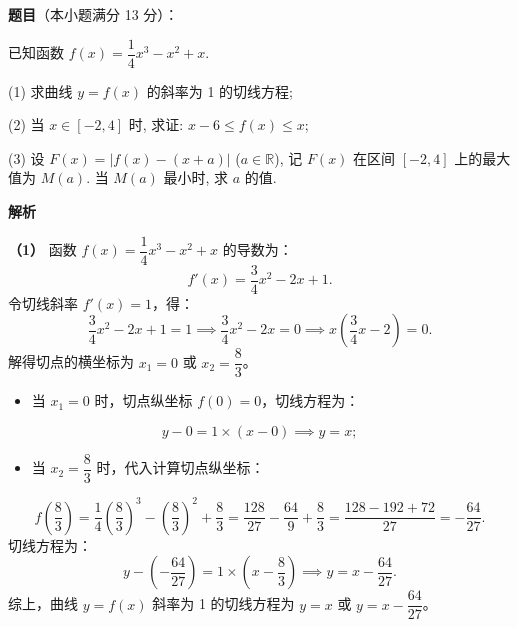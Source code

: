 \begin{answer}

\textbf{题目}（本小题满分 13 分）：

已知函数 $f(x) = \dfrac{1}{4}x^3 - x^2 + x$.

(1) 求曲线 $y = f(x)$ 的斜率为 1 的切线方程;

(2) 当 $x \in [-2, 4]$ 时, 求证: $x - 6 \leqslant f(x) \leqslant x$;

(3) 设 $F(x) = |f(x) - (x + a)|$ ($a \in \mathbb{R}$), 记 $F(x)$ 在区间 $[-2, 4]$ 上的最大值为 $M(a)$. 当 $M(a)$ 最小时, 求 $a$ 的值.

\textbf{解析}

\textbf{（1）}
函数 $f(x) = \dfrac{1}{4}x^3 - x^2 + x$ 的导数为：
\nopagebreak[4]
\[f'(x) = \dfrac{3}{4}x^2 - 2x + 1.\]
令切线斜率 $f'(x) = 1$，得：
\nopagebreak[4]
\[\dfrac{3}{4}x^2 - 2x + 1 = 1 \implies \dfrac{3}{4}x^2 - 2x = 0 \implies x\left(\dfrac{3}{4}x - 2\right) = 0.\]
解得切点的横坐标为 $x_1 = 0$ 或 $x_2 = \dfrac{8}{3}$。
\begin{itemize}
\item 当 $x_1 = 0$ 时，切点纵坐标 $f(0) = 0$，切线方程为：
\end{itemize}
\nopagebreak[4]
\[y - 0 = 1 \times (x - 0) \implies y = x;\]
\begin{itemize}
\item 当 $x_2 = \dfrac{8}{3}$ 时，代入计算切点纵坐标：
\end{itemize}
\nopagebreak[4]
\[f\left(\dfrac{8}{3}\right) = \dfrac{1}{4}\left(\dfrac{8}{3}\right)^3 - \left(\dfrac{8}{3}\right)^2 + \dfrac{8}{3} = \dfrac{128}{27} - \dfrac{64}{9} + \dfrac{8}{3} = \dfrac{128 - 192 + 72}{27} = -\dfrac{64}{27}.\]
  切线方程为：
\nopagebreak[4]
\[y - \left(-\dfrac{64}{27}\right) = 1 \times \left(x - \dfrac{8}{3}\right) \implies y = x - \dfrac{64}{27}.\]
综上，曲线 $y = f(x)$ 斜率为 1 的切线方程为 $y = x$ 或 $y = x - \dfrac{64}{27}$。


\end{answer}
